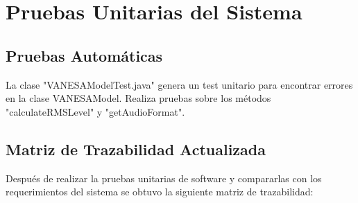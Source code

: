 \documentclass[10pt]{article} %
\begin{document}
\section{Pruebas Unitarias del Sistema}

\subsection{Pruebas Automáticas}
La clase "VANESAModelTest.java" genera un test unitario para encontrar errores en la clase VANESAModel. Realiza pruebas sobre los métodos "calculateRMSLevel" y "getAudioFormat".



\subsection{Matriz de Trazabilidad Actualizada}
Después de realizar la pruebas unitarias de software y compararlas con los requerimientos del sistema se obtuvo la siguiente matriz de trazabilidad:

\begin{figure}[H] %
\label{fig:MatrizDeTrazabilidad}
\end{figure}
\end{document}

